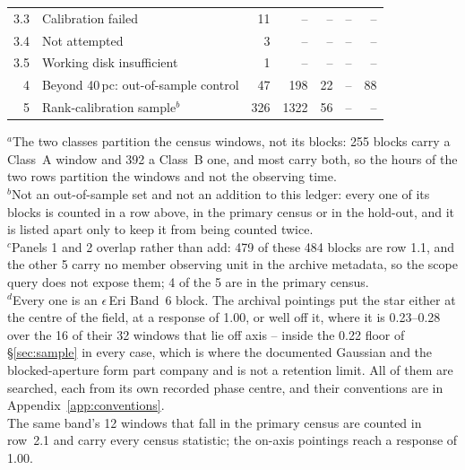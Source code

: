 \begin{tabular}{@{}r@{~}p{}rrrrr@{}}
3.3 & \hspace{0.8em}Calibration failed & 11 & -- & -- & -- & -- \\
3.4 & \hspace{0.8em}Not attempted & 3 & -- & -- & -- & -- \\
3.5 & \hspace{0.8em}Working disk insufficient & 1 & -- & -- & -- & -- \\
\hline
4 & Beyond 40\,pc: out-of-sample control & 47 & 198 & 22 & -- & 88 \\
5 & Rank-calibration sample$^{b}$ & 326 & 1322 & 56 & -- & -- \\
\hline
\end{tabular}

{\footnotesize\raggedright $^{a}$The two classes partition the census windows, not its blocks: 255 blocks carry a Class~A window and 392 a Class~B one, and most carry both, so the hours of the two rows partition the windows and not the observing time.\\ $^{b}$Not an out-of-sample set and not an addition to this ledger: every one of its blocks is counted in a row above, in the primary census or in the hold-out, and it is listed apart only to keep it from being counted twice.\\ $^{c}$Panels 1 and 2 overlap rather than add: 479 of these 484 blocks are row 1.1, and the other 5 carry no member observing unit in the archive metadata, so the scope query does not expose them; 4 of the 5 are in the primary census.\\ $^{d}$Every one is an $\epsilon$\,Eri Band~6 block. The archival pointings put the star either at the centre of the field, at a response of 1.00, or well off it, where it is 0.23--0.28 over the 16 of their 32 windows that lie off axis -- inside the 0.22 floor of \S\ref{sec:sample} in every case, which is where the documented Gaussian and the blocked-aperture form part company and is not a retention limit. All of them are searched, each from its own recorded phase centre, and their conventions are in Appendix~\ref{app:conventions}.\\ The same band's 12 windows that fall in the primary census are counted in row~2.1 and carry every census statistic; the on-axis pointings reach a response of 1.00.}
